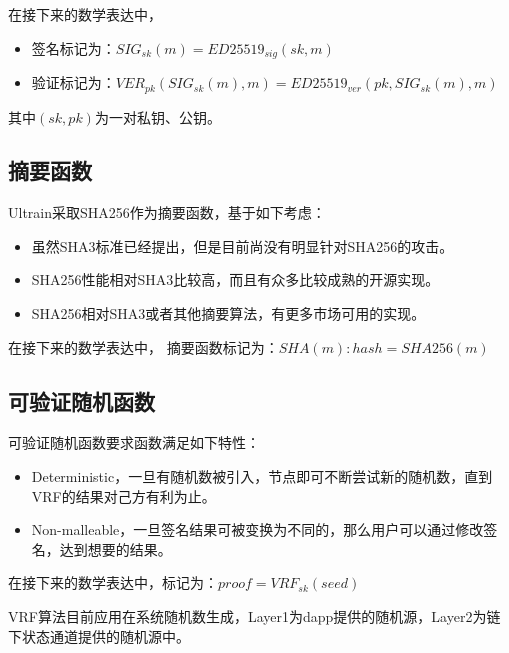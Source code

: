 \documentclass[12pt, UTF8]{article}
\begin{document}
在接下来的数学表达中，
\begin{itemize}
\item 签名标记为：$SIG_{sk}(m)=ED25519_{sig} (sk,m)$
\item 验证标记为：$VER_{pk}(SIG_{sk}(m), m)=ED25519_{ver} (pk,SIG_{sk}(m), m)$
\end{itemize}
其中$(sk, pk)$为一对私钥、公钥。

\subsection{摘要函数}
Ultrain采取SHA256作为摘要函数，基于如下考虑：
\begin{itemize}
\item 虽然SHA3标准已经提出，但是目前尚没有明显针对SHA256的攻击。
\item SHA256性能相对SHA3比较高，而且有众多比较成熟的开源实现。
\item SHA256相对SHA3或者其他摘要算法，有更多市场可用的实现。
\end{itemize}

在接下来的数学表达中，
摘要函数标记为：$SHA(m): hash = SHA256(m)$

\subsection{可验证随机函数}
\begin{comment}
密码学主要采用高速，高安全性的成熟密码学算法
VRF\cite{micali1999verifiable}有两种选择
\begin{itemize}
\item 类似Algorand中的选择，采用non-mallable签名
\item ED25519，但是为了保证non-mallable，我们采用了限制密文格式，比如要求高位为0；但是这个限制有可能影响我们的随机选择时候的公平性
\end{itemize}
\end{comment}

可验证随机函数要求函数满足如下特性：
\begin{itemize}
\item Deterministic，一旦有随机数被引入，节点即可不断尝试新的随机数，直到VRF的结果对己方有利为止。
\item Non-malleable，一旦签名结果可被变换为不同的，那么用户可以通过修改签名，达到想要的结果。
\end{itemize}

在接下来的数学表达中，标记为：$proof= VRF_{sk} (seed)$

VRF算法目前应用在系统随机数生成，Layer1为dapp提供的随机源，Layer2为链下状态通道提供的随机源中。
\end{document}
